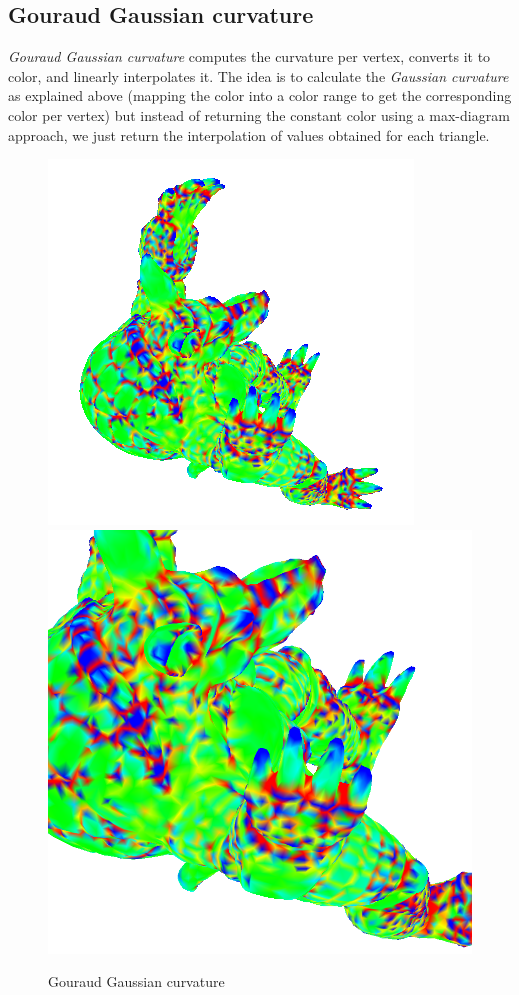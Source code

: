 \subsection{Gouraud Gaussian curvature}
\textit{Gouraud Gaussian curvature} computes the curvature per vertex, converts it to color, and linearly interpolates it. The idea is to calculate the \textit{Gaussian curvature} as explained above (mapping the color into a color range to get the corresponding color per vertex) but instead of returning the constant color using a max-diagram approach, we just return the interpolation of values obtained for each triangle.

\begin{figure}[!h]
    \centering
    \centering
    \includegraphics[scale=1.0]{images/gci-armadillo-top.png}
    \endminipage\hfill
    \centering
    \includegraphics[scale=0.4]{images/gci-detail-armadillo-top.png}
    \endminipage
    \caption{Gouraud Gaussian curvature} \label{fig:gci-detail}
\end{figure}


